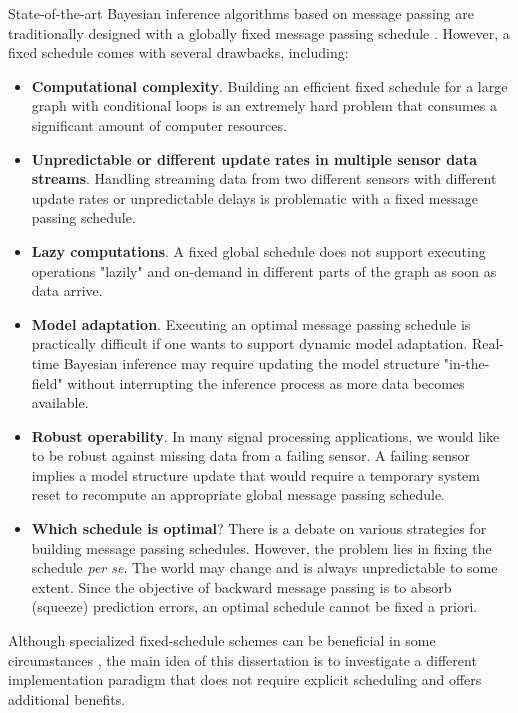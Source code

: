 State-of-the-art Bayesian inference algorithms based on message passing are traditionally
designed with a globally fixed message passing schedule \citep{kschischang_factor_2001}.
However, a fixed schedule comes with several drawbacks, including:
\begin{itemize}
  \item
        \textbf{Computational complexity}. Building an efficient fixed schedule for a large graph with
        conditional loops is an extremely hard problem that consumes a significant amount of computer
        resources.
  \item \textbf{Unpredictable or different update rates in multiple sensor data streams}.
        Handling streaming data from two different sensors with different update rates or
        unpredictable delays is problematic with a fixed message passing schedule.
  \item \textbf{Lazy computations}.
        A fixed global schedule does not support executing operations "lazily" and on-demand in
        different parts of the graph as soon as data arrive.
  \item \textbf{Model adaptation}.
        Executing an optimal message passing schedule is practically difficult if one wants to support
        dynamic model adaptation.
        Real-time Bayesian inference may require updating the model structure "in-the-field" without
        interrupting the inference process as more data becomes available.
  \item \textbf{Robust operability}.
        In many signal processing applications, we would like to be robust against missing data from a
        failing sensor.
        A failing sensor implies a model structure update that would require a temporary system reset
        to recompute an appropriate global message passing schedule.
  \item \textbf{Which schedule is optimal}?
        There is a debate on various strategies for building message passing
        schedules\citep{elidan_residual_2012, radosavljevic_optimized_2005, sharon_efficient_2004}.
        However, the problem lies in fixing the schedule \textit{per se}.
        The world may change and is always unpredictable to some extent.
        Since the objective of backward message passing is to absorb (squeeze) prediction errors, an
        optimal schedule cannot be fixed a priori.
\end{itemize}

Although specialized fixed-schedule schemes can be beneficial in some circumstances
\citep{appice_message_2015}, the main idea of this dissertation is to investigate a different
implementation paradigm that does not require explicit scheduling and offers additional
benefits.

